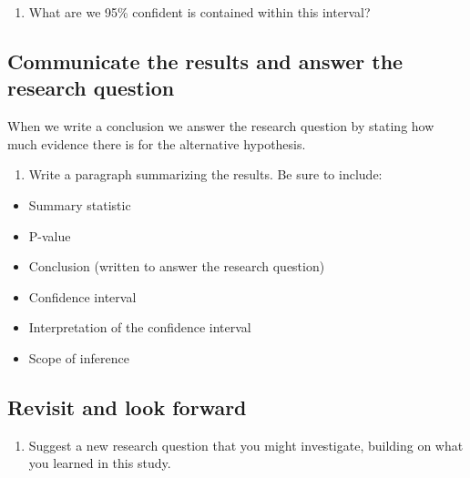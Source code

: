 \documentclass[
]{report}
\providecommand{\tightlist}{%
  \setlength{\itemsep}{0pt}\setlength{\parskip}{0pt}}
\begin{document}
\begin{enumerate}
\def\labelenumi{\arabic{enumi}.}
\setcounter{enumi}{26}
\tightlist
\item
  What are we 95\% confident is contained within this interval?
\end{enumerate}

\vspace{1in}

\newpage

\hypertarget{communicate-the-results-and-answer-the-research-question}{%
\subsection{Communicate the results and answer the research question}\label{communicate-the-results-and-answer-the-research-question}}

When we write a conclusion we answer the research question by stating how much evidence there is for the alternative hypothesis.

\begin{enumerate}
\def\labelenumi{\arabic{enumi}.}
\setcounter{enumi}{27}
\tightlist
\item
  Write a paragraph summarizing the results. Be sure to include:
\end{enumerate}

\begin{itemize}
\item
  Summary statistic
\item
  P-value
\item
  Conclusion (written to answer the research question)
\item
  Confidence interval
\item
  Interpretation of the confidence interval
\item
  Scope of inference
\end{itemize}

\vspace{3in}

\hypertarget{revisit-and-look-forward}{%
\subsection{Revisit and look forward}\label{revisit-and-look-forward}}

\begin{enumerate}
\def\labelenumi{\arabic{enumi}.}
\setcounter{enumi}{28}
\tightlist
\item
  Suggest a new research question that you might investigate, building on what you learned in this study.
\end{enumerate}
\end{document}
